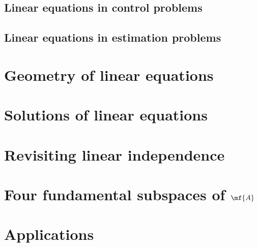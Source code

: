 \subsection{Linear equations in control problems}


\subsection{Linear equations in estimation problems}


\section{Geometry of linear equations}


\section{Solutions of linear equations}


\section{Revisiting linear independence}

\section{Four fundamental subspaces of $\mf{A}$}


\section{Applications}